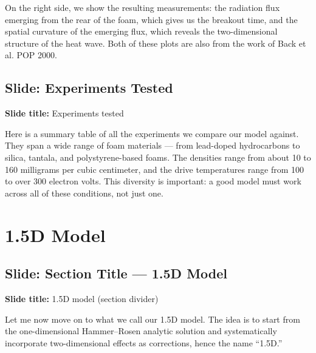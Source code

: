 \documentclass[12pt, a4paper]{article}
\begin{document}
On the right side, we show the resulting measurements: the radiation flux emerging from the rear of the foam, which gives us the breakout time, and the spatial curvature of the emerging flux, which reveals the two-dimensional structure of the heat wave. Both of these plots are also from the work of Back et al. POP 2000.

\subsection{Slide: Experiments Tested}

\begin{slidebox}
\textbf{Slide title:} Experiments tested
\end{slidebox}

Here is a summary table of all the experiments we compare our model against. They span a wide range of foam materials --- from lead-doped hydrocarbons to silica, tantala, and polystyrene-based foams. The densities range from about 10 to 160 milligrams per cubic centimeter, and the drive temperatures range from 100 to over 300 electron volts. This diversity is important: a good model must work across all of these conditions, not just one.

\section{1.5D Model}

\subsection{Slide: Section Title --- 1.5D Model}

\begin{slidebox}
\textbf{Slide title:} 1.5D model (section divider)
\end{slidebox}

Let me now move on to what we call our 1.5D model. The idea is to start from the one-dimensional Hammer--Rosen analytic solution and systematically incorporate two-dimensional effects as corrections, hence the name ``1.5D.''
\end{document}
